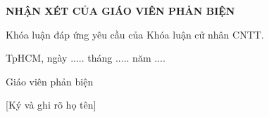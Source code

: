 \newpage
\begin{center}
\textbf{\Large NHẬN XÉT CỦA GIÁO VIÊN PHẢN BIỆN }
\vspace{1cm}
\dotcolumnfill
\raggedright Khóa luận đáp ứng yêu cầu của Khóa luận cử nhân CNTT.
\end{center}


\hspace{7cm}TpHCM, ngày ..... tháng ..... năm ....

\hspace{8.5cm}Giáo viên phản biện

\hspace{8.5cm}[Ký và ghi rõ họ tên]